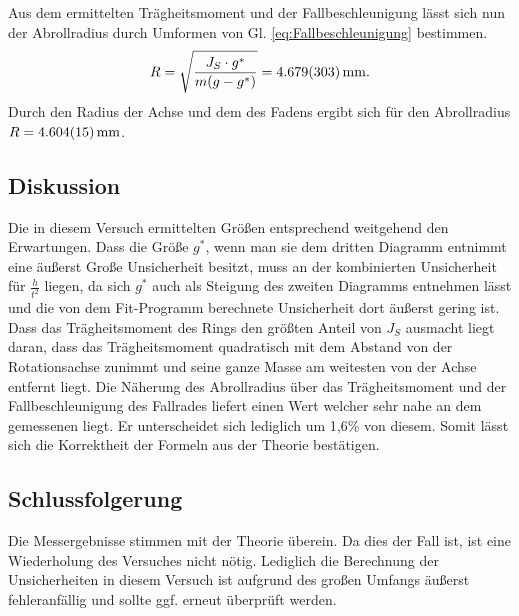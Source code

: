 Aus dem ermittelten Trägheitsmoment und der Fallbeschleunigung lässt sich nun der Abrollradius durch Umformen von Gl. \ref{eq:Fallbeschleunigung} bestimmen.
\begin{equation}
R = \sqrt{\frac{J_S \cdot g^{*}}{m(g-g^{*})}} = \SI{4,679+-0,303}{\mm}.
\end{equation}
Durch den Radius der Achse und dem des Fadens ergibt sich für den Abrollradius $R = \SI{4,604+-0,015}{\mm}$.

\subsection{Diskussion}

Die in diesem Versuch ermittelten Größen entsprechend weitgehend den Erwartungen. Dass die Größe $g^{*}$, wenn man sie dem dritten Diagramm entnimmt eine äußerst Große Unsicherheit besitzt, muss an der kombinierten Unsicherheit für $\frac{h}{t^2}$ liegen, da sich $g^{*}$ auch als Steigung des zweiten Diagramms entnehmen lässt und die von dem Fit-Programm berechnete Unsicherheit dort äußerst gering ist. Dass das Trägheitsmoment des Rings den größten Anteil von $J_S$ ausmacht liegt daran, dass das Trägheitsmoment quadratisch mit dem Abstand von der Rotationsachse zunimmt und seine ganze Masse am weitesten von der Achse entfernt liegt.
Die Näherung des Abrollradius über das Trägheitsmoment und der Fallbeschleunigung des Fallrades liefert einen Wert welcher sehr nahe an dem gemessenen liegt. Er unterscheidet sich lediglich um 1,6\% von diesem. Somit lässt sich die Korrektheit der Formeln aus der Theorie bestätigen.

\subsection{Schlussfolgerung}

Die Messergebnisse stimmen mit der Theorie überein. Da dies der Fall ist, ist eine Wiederholung des Versuches nicht nötig.
Lediglich die Berechnung der Unsicherheiten in diesem Versuch ist aufgrund des großen Umfangs äußerst fehleranfällig und sollte ggf. erneut überprüft werden.